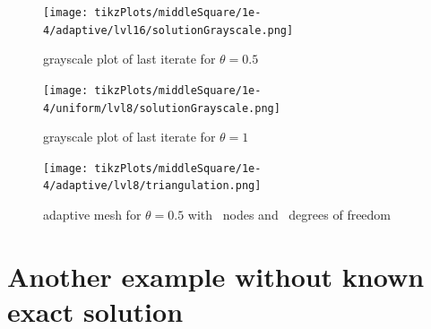 \documentclass[draft=false,twoside,12pt]{scrreprt}
\begin{document}
\begin{minipage}[t]{0.5\textwidth}
  \begin{figure}[H]
	  \centering
		\texttt{[image: tikzPlots/middleSquare/1e-4/adaptive/lvl16/solutionGrayscale.png]}
    \caption{grayscale plot of last iterate for $\theta = 0.5$}
  \end{figure}
\end{minipage}
\begin{minipage}[t]{0.5\textwidth}
  \begin{figure}[H]
	  \centering
		\texttt{[image: tikzPlots/middleSquare/1e-4/uniform/lvl8/solutionGrayscale.png]}
    \caption{grayscale plot of last iterate for $\theta = 1$}
  \end{figure}
\end{minipage}


\begin{figure}[H]
	\centering
  \texttt{[image: tikzPlots/middleSquare/1e-4/adaptive/lvl8/triangulation.png]}
  \caption{adaptive mesh for $\theta = 0.5$ with \nrNodes\ nodes and 
  \nrDof\ degrees of freedom}
\end{figure}


\section{Another example without known exact solution}
\end{document}
